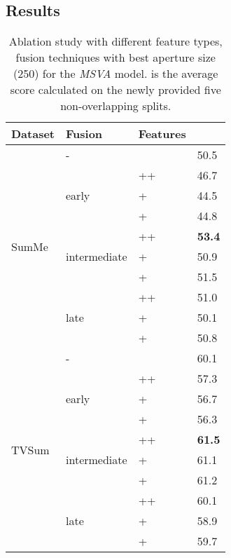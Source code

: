 \documentclass{article}
\begin{document}
\subsection{Results}

\begin{table}[!ht]
\caption{Ablation study with different feature types, fusion techniques with best aperture size (250) for the \textit{MSVA} model.  is the average score calculated on the newly provided five non-overlapping splits.}
\centering
\begin{tabular}{|*{4}{l|}}
\hline 
\textbf{Dataset}  & Fusion & Features&  \\ \hline
  & - &  & 50.5 \\  \cline{2-4} 
  & \multirow{3}{5em}{early} & ++ & 46.7 \\ \cline{3-4} 
  &  & + &  44.5 \\ \cline{3-4} 
\multirow{4}{4em}{SumMe}   &  & + &  44.8 \\ \cline{2-4} 
   
 &  \multirow{3}{5em}{intermediate} & ++ & \textbf{53.4} \\ \cline{3-4}
 &  & + & 50.9 \\ \cline{3-4} 
&  & + &  51.5 \\ \cline{2-4} 
   
 & \multirow{3}{5em}{late}  & ++ & 51.0 \\  \cline{3-4}
 &  & +  & 50.1 \\ \cline{3-4} 
&  & +  & 50.8 \\ \cline{2-4} 

 
\hline 
\hline 
 
 & - &   & 60.1 \\ \cline{2-4}
 & \multirow{3}{5em}{early}  & ++  & 57.3 \\  \cline{3-4}
&  & + & 56.7 \\ \cline{3-4} 
\multirow{4}{4em}{TVSum} &  & + &  56.3 \\ \cline{2-4} 
   
 & \multirow{3}{5em}{intermediate} & ++ &  \textbf{61.5} \\  \cline{3-4}
 &  & + & 61.1 \\ \cline{3-4} 
&  & + & 61.2 \\ \cline{2-4}

 & \multirow{3}{5em}{late} & ++ & 60.1 \\  \cline{3-4}
 &  & + &  58.9 \\ \cline{3-4} 
&  & + &  59.7 \\ \cline{2-4} 
\hline 
 
\end{tabular}
\label{tab:ablation}
\end{table}
\end{document}
